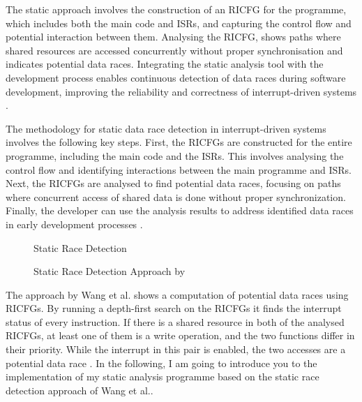 \documentclass[
fancyheadings, %
%
%
]{stsreprt}
\begin{document}
{		The static approach involves the construction of an RICFG for the programme, which includes both the main code and ISRs, and capturing the control flow and potential interaction between them. Analysing the RICFG, shows paths where shared resources are accessed concurrently without proper synchronisation and indicates potential data races. Integrating the static analysis tool with the development process enables continuous detection of data races during software development, improving the reliability and correctness of interrupt-driven systems \cite{wang2020}.
		
		The methodology for static data race detection in interrupt-driven systems involves the following key steps. First, the RICFGs are constructed for the entire programme, including the main code and the ISRs. This involves analysing the control flow and identifying interactions between the main programme and ISRs. Next, the RICFGs are analysed to find potential data races, focusing on paths where concurrent access of shared data is done without proper synchronization. Finally, the developer can use the analysis results to address identified data races in early development processes \cite{wang2020}.
		
		\begin{figure}[H]
			\begin{algorithm}[H]
				\caption{Static Race Detection}
				
				\BlankLine
			\end{algorithm}
			\caption{Static Race Detection Approach by \cite{wang2020}}
		\end{figure}
		
		The approach by Wang et al. shows a computation of potential data races using RICFGs. By running a depth-first search on the RICFGs it finds the interrupt status of every instruction. If there is a shared resource in both of the analysed RICFGs, at least one of them is a write operation, and the two functions differ in their priority. While the interrupt in this pair is enabled, the two accesses are a potential data race \cite{wang2020}.
		In the following, I am going to introduce you to the implementation of my static analysis programme based on the static race detection approach of Wang et al..
		
}
\end{document}
